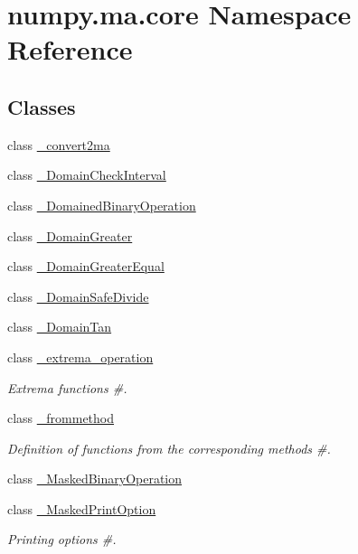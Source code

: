 \hypertarget{namespacenumpy_1_1ma_1_1core}{}\section{numpy.\+ma.\+core Namespace Reference}
\label{namespacenumpy_1_1ma_1_1core}
\subsection*{Classes}
\begin{DoxyCompactItemize}
\item 
class \hyperlink{classnumpy_1_1ma_1_1core_1_1__convert2ma}{\+\_\+convert2ma}
\item 
class \hyperlink{classnumpy_1_1ma_1_1core_1_1__DomainCheckInterval}{\+\_\+\+Domain\+Check\+Interval}
\item 
class \hyperlink{classnumpy_1_1ma_1_1core_1_1__DomainedBinaryOperation}{\+\_\+\+Domained\+Binary\+Operation}
\item 
class \hyperlink{classnumpy_1_1ma_1_1core_1_1__DomainGreater}{\+\_\+\+Domain\+Greater}
\item 
class \hyperlink{classnumpy_1_1ma_1_1core_1_1__DomainGreaterEqual}{\+\_\+\+Domain\+Greater\+Equal}
\item 
class \hyperlink{classnumpy_1_1ma_1_1core_1_1__DomainSafeDivide}{\+\_\+\+Domain\+Safe\+Divide}
\item 
class \hyperlink{classnumpy_1_1ma_1_1core_1_1__DomainTan}{\+\_\+\+Domain\+Tan}
\item 
class \hyperlink{classnumpy_1_1ma_1_1core_1_1__extrema__operation}{\+\_\+extrema\+\_\+operation}
\begin{DoxyCompactList}\small\item\em Extrema functions \#. \end{DoxyCompactList}\item 
class \hyperlink{classnumpy_1_1ma_1_1core_1_1__frommethod}{\+\_\+frommethod}
\begin{DoxyCompactList}\small\item\em Definition of functions from the corresponding methods \#. \end{DoxyCompactList}\item 
class \hyperlink{classnumpy_1_1ma_1_1core_1_1__MaskedBinaryOperation}{\+\_\+\+Masked\+Binary\+Operation}
\item 
class \hyperlink{classnumpy_1_1ma_1_1core_1_1__MaskedPrintOption}{\+\_\+\+Masked\+Print\+Option}
\begin{DoxyCompactList}\small\item\em Printing options \#. \end{DoxyCompactList}\item 

\end{DoxyCompactItemize}
